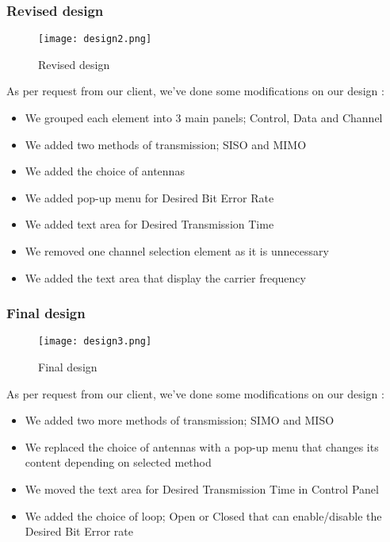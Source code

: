 \documentclass[12pt,a4paper]{article}
\begin{document}
\clearpage
\subsubsection{Revised design}
\begin{figure}[ht]
  \centering
    \texttt{[image: design2.png]}
  \caption{Revised design}
  \label{fig:design2 }
\end{figure}
\par As per request from our client, we've done some modifications on our design :
\begin{itemize}
	\item We grouped each element into 3 main panels; Control, Data and Channel
	\item We added two methods of transmission; SISO and MIMO
	\item We added the choice of antennas
	\item We added pop-up menu for Desired Bit Error Rate
	\item We added text area for Desired Transmission Time
	\item We removed one channel selection element as it is unnecessary
	\item We added the text area that display the carrier frequency
\end{itemize}

\clearpage
\subsubsection{Final design}
\begin{figure}[ht]
  \centering
    \texttt{[image: design3.png]}
  \caption{Final design}
  \label{fig:design3 }
\end{figure}

\par As per request from our client, we've done some modifications on our design :
\begin{itemize}
	\item We added two more methods of transmission; SIMO and MISO
	\item We replaced the choice of antennas with a pop-up menu that changes its content depending on selected method
	\item We moved the text area for Desired Transmission Time in Control Panel
	\item We added the choice of loop; Open or Closed that can enable/disable the Desired Bit Error rate
\end{itemize}
\end{document}
